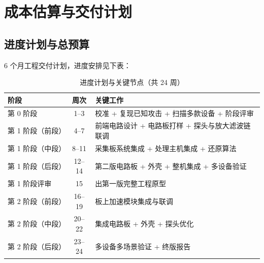 \documentclass[a4paper,11pt,oneside,UTF8,scheme=plain]{ctexart}
\begin{document}
\section{成本估算与交付计划}
\label{sec:ch6}

\subsection{进度计划与总预算}
\label{sec:ch6-milestones}

6 个月工程交付计划，进度安排见下表：

\begin{table}[H]
\centering
\caption{进度计划与关键节点（共 24 周）}
\label{tab:gantt}
\footnotesize
\begin{tabularx}{\textwidth}{lc>{\raggedright\arraybackslash}X}
\toprule
\rowcolor{tableheader}
\textbf{阶段} & \textbf{周次} & \textbf{关键工作} \\
\midrule
第 0 阶段  & 1--3   & 校准 + 复现已知攻击 + 扫描多款设备 + 阶段评审 \\
第 1 阶段（前段） & 4--7   & 前端电路设计 + 电路板打样 + 探头与放大滤波链联调 \\
第 1 阶段（中段） & 8--11  & 采集板系统集成 + 处理主机集成 + 还原算法 \\
第 1 阶段（后段） & 12--14 & 第二版电路板 + 外壳 + 整机集成 + 多设备验证 \\
第 1 阶段评审 & 15 & 出第一版完整工程原型 \\
第 2 阶段（前段） & 16--19 & 板上加速模块集成与联调 \\
第 2 阶段（中段） & 20--22 & 集成电路板 + 外壳 + 探头优化 \\
第 2 阶段（后段） & 23--24 & 多设备多场景验证 + 终版报告 \\
\bottomrule
\end{tabularx}
\end{table}
\end{document}
